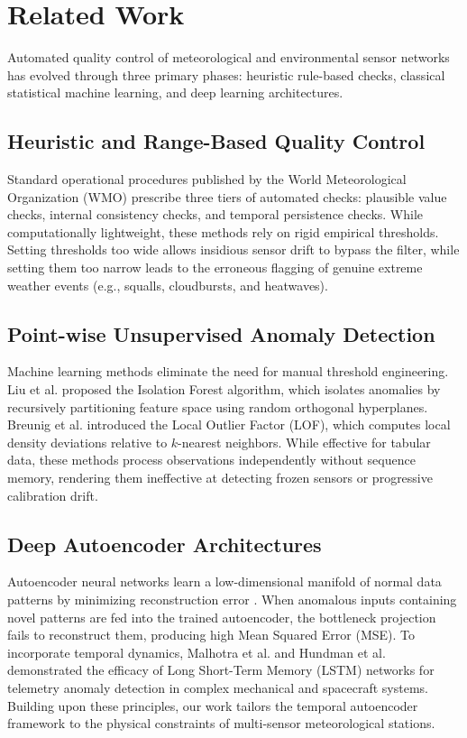 \documentclass[conference]{IEEEtran}
\begin{document}
\section{Related Work}
Automated quality control of meteorological and environmental sensor networks has evolved through three primary phases: heuristic rule-based checks, classical statistical machine learning, and deep learning architectures.

\subsection{Heuristic and Range-Based Quality Control}
Standard operational procedures published by the World Meteorological Organization (WMO) \cite{wmo2018guide} prescribe three tiers of automated checks: plausible value checks, internal consistency checks, and temporal persistence checks. While computationally lightweight, these methods rely on rigid empirical thresholds. Setting thresholds too wide allows insidious sensor drift to bypass the filter, while setting them too narrow leads to the erroneous flagging of genuine extreme weather events (e.g., squalls, cloudbursts, and heatwaves).

\subsection{Point-wise Unsupervised Anomaly Detection}
Machine learning methods eliminate the need for manual threshold engineering. Liu et al. \cite{liu2008isolation} proposed the Isolation Forest algorithm, which isolates anomalies by recursively partitioning feature space using random orthogonal hyperplanes. Breunig et al. \cite{breunig2000lof} introduced the Local Outlier Factor (LOF), which computes local density deviations relative to $k$-nearest neighbors. While effective for tabular data, these methods process observations independently without sequence memory, rendering them ineffective at detecting frozen sensors or progressive calibration drift.

\subsection{Deep Autoencoder Architectures}
Autoencoder neural networks learn a low-dimensional manifold of normal data patterns by minimizing reconstruction error \cite{sakurada2014anomaly}. When anomalous inputs containing novel patterns are fed into the trained autoencoder, the bottleneck projection fails to reconstruct them, producing high Mean Squared Error (MSE). To incorporate temporal dynamics, Malhotra et al. \cite{malhotra2016lstm} and Hundman et al. \cite{hundman2018detecting} demonstrated the efficacy of Long Short-Term Memory (LSTM) networks for telemetry anomaly detection in complex mechanical and spacecraft systems. Building upon these principles, our work tailors the temporal autoencoder framework to the physical constraints of multi-sensor meteorological stations.
\end{document}
